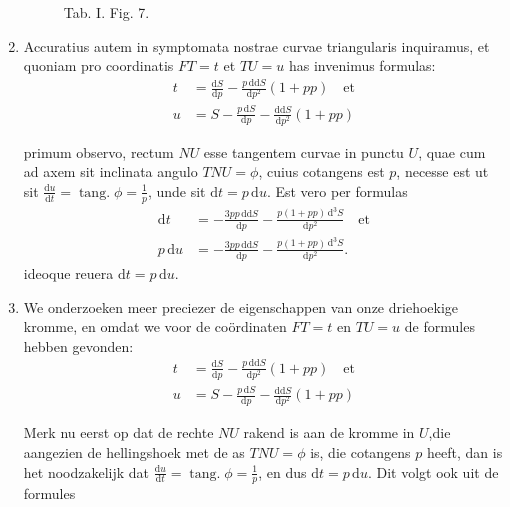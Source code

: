 \documentclass[10pt,a4paper]{article}
\newcommand{\switchenum}{\setcounter{enumi}{\arabic{enumi}-1}\switchcolumn}
\DeclareMathOperator{\tang}{tang.}
\def\D{\mathrm{d}}
\begin{document}
\begin{paracol}{2}
\begin{enumerate}[topsep=1px]
\begin{figure}[h]
{}
			\selectfont
			\caption{Tab. I. Fig. 7.}
		\end{figure}

		\switchcolumn*
		
		\item Accuratius autem in symptomata nostrae curvae triangularis inquiramus, et quoniam pro coordinatis $FT=t$ et $TU=u$ has invenimus formulas:
		\begin{align*}
			t & = \frac{\D S}{\D p}-\frac{p\,\D \D S}{\D p^2}(1+pp)\quad\text{et}\\
			u & = S-\frac{p\,\D S}{\D p}-\frac{\D\D S}{\D p^2}(1+pp)
		\end{align*}
		\par primum observo, rectum $NU$ esse tangentem curvae in punctu $U$, quae cum ad axem sit inclinata angulo $TNU=\phi$, cuius cotangens est $p$, necesse est ut sit $\frac{\D u}{\D t} = \tang \phi = \frac{1}{p}$, unde sit $\D t = p\, \D u$. Est vero per formulas
		\begin{align*}
			\D t &= -\frac{3pp\, \D\D S}{\D p}-\frac{p(1+pp)\, \D^3S}{\D p^2} \quad \text{et}\\
			p\, \D u &= - \frac{3pp \, \D \D S}{\D p} - \frac{p(1+pp)\, \D^3S}{\D p^2}.
		\end{align*}
		ideoque reuera $\D t=p\, \D u$.
		
		\switchenum
		\item We onderzoeken meer preciezer de eigenschappen van onze driehoekige kromme, en omdat we voor de coördinaten $FT=t$ en $TU=u$ de formules hebben gevonden:
		\begin{align*}
			t & = \frac{\D S}{\D p}-\frac{p\,\D \D S}{\D p^2}(1+pp)\quad\text{et}\\
			u & = S-\frac{p\,\D S}{\D p}-\frac{\D\D S}{\D p^2}(1+pp)
		\end{align*}
		\par Merk nu eerst op dat de rechte $NU$ rakend is aan de kromme in $U$,die aangezien de hellingshoek met de as $TNU=\phi$ is, die cotangens $p$ heeft, dan is het noodzakelijk dat $\frac{\D u}{\D t} = \tang \phi = \frac{1}{p}$, en dus $\D t = p \, \D u$. Dit volgt ook uit de formules 


\end{enumerate}
\end{paracol}
\end{document}

